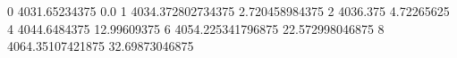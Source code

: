 0 4031.65234375 0.0
1 4034.372802734375 2.720458984375
2 4036.375 4.72265625
4 4044.6484375 12.99609375
6 4054.225341796875 22.572998046875
8 4064.35107421875 32.69873046875
